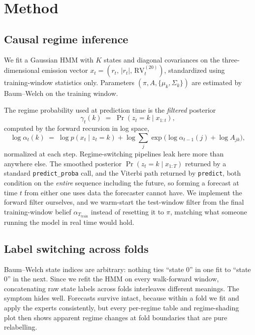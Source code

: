 \documentclass[sigconf,nonacm]{acmart}
\begin{document}
\section{Method}

\subsection{Causal regime inference}

We fit a Gaussian HMM with $K$ states and diagonal covariances on the
three-dimensional emission vector $x_t = (r_t,\, |r_t|,\, \mathrm{RV}^{(20)}_t)$,
standardized using training-window statistics only. Parameters
$(\pi, A, \{\mu_k, \Sigma_k\})$ are estimated by Baum--Welch on the training
window.

The regime probability used at prediction time is the \emph{filtered} posterior
\begin{equation}
  \gamma_t(k) \;=\; \Pr\!\left(z_t = k \mid x_{1:t}\right),
\end{equation}
computed by the forward recursion in log space,
\begin{equation}
  \log\alpha_t(k) \;=\; \log p(x_t \mid z_t{=}k) +
  \log\!\!\sum_{j} \exp\!\big(\log\alpha_{t-1}(j) + \log A_{jk}\big),
\end{equation}
normalized at each step. Regime-switching pipelines leak here more than anywhere
else. The smoothed posterior $\Pr(z_t = k \mid x_{1:T})$ returned by a standard
\texttt{predict\_proba} call, and the Viterbi path returned by \texttt{predict},
both condition on the \emph{entire} sequence including the future, so forming a
forecast at time $t$ from either one uses data the forecaster cannot have. We
implement the forward filter ourselves, and we warm-start the test-window filter
from the final training-window belief $\alpha_{T_{\text{train}}}$ instead of
resetting it to $\pi$, matching what someone running the model in real time
would hold.

\subsection{Label switching across folds}

Baum--Welch state indices are arbitrary: nothing ties ``state 0'' in one fit to
``state 0'' in the next. Since we refit the HMM on every walk-forward window,
concatenating raw state labels across folds interleaves different meanings. The
symptom hides well. Forecasts survive intact, because within a fold we fit and
apply the experts consistently, but every per-regime table and regime-shading
plot then shows apparent regime changes at fold boundaries that are pure
relabelling.
\end{document}
